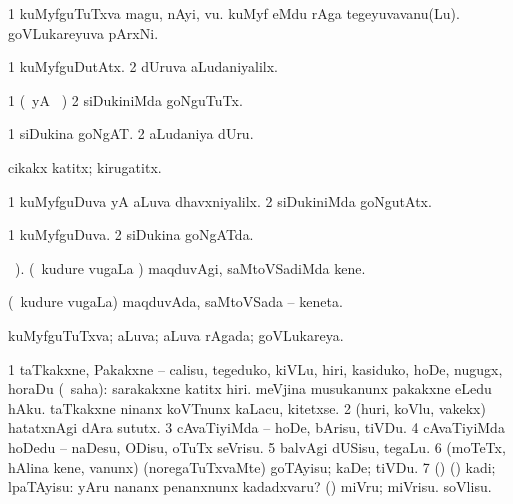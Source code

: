 {{{{{{\bentry
{} 
\gl{\nA}
\expl{}
\bmng
\bnum
\num{1} kuMyfguTuTxva magu, nAyi, \mo vu. 
\banum
{} kuMyf eMdu rAga tegeyuvavanu(Lu). 
 goVLukareyuva pArxNi. 
\eanum
\numie
\enum
\emng
\eentry

\bentry
{} 
\gl{\kirxvi}
\expl{}
\bmng
\bnum
\num{1} kuMyfguDutAtx. 
\num{2} dUruva aLudaniyalilx. 
\enum
\emng
\eentry

\bentry
{} 
\gl{\akirx}
\expl{}
\bmng
\bnum
\num{1} (\pArxM\ yA \AseTxrXV\ \parx)  
\num{2} siDukiniMda goNguTuTx. 
\enum
\emng
\eentry

\bentry
{} 
\gl{\nA}
\expl{}
\bmng
\bnum
\num{1} siDukina goNgAT. 
\num{2} aLudaniya dUru. 
\enum
\emng
\eentry

\bentry
{} 
\gl{\nA}
\expl{}
\bmng
cikakx katitx; kirugatitx. 
\emng
\eentry

\bentry
{} 
\gl{\kirxvi}
\expl{}
\bmng
\bnum
\num{1} kuMyfguDuva yA aLuva dhavxniyalilx. 
\num{2} siDukiniMda goNgutAtx. 
\enum
\emng
\eentry

\bentry
{} 
\gl{\gu}
\expl{}
\bmng
\bnum
\num{1} kuMyfguDuva. 
\num{2} siDukina goNgATda. 
\enum
\emng
\eentry

\bentry
{} 
\gl{\akirx}
 \BUkaq\ ). \bmng
(\sA\ kudure \mo vugaLa \vi) maqduvAgi, saMtoVSadiMda kene. 
\emng
\eentry

\bentry
{} 
\gl{\nA}
\bmng
(\sA\ kudure \mo vugaLa) maqduvAda, saMtoVSada -- keneta. 
\emng
\eentry

\bentry
{} 
\gl{\nA}
\expl{}
\bmng
{} 
\emng
\eentry

\bentry
{} 
\gl{\gu}
\bmng
kuMyfguTuTxva; aLuva; aLuva rAgada; goVLukareya. 
\emng
\eentry

\bentry
{} 
\gl{\sakirx}
\bmng
\bnum
\num{1} taTkakxne, Pakakxne -- calisu, tegeduko, kiVLu, hiri, kasiduko, hoDe, nugugx, horaDu (\akirx\ saha):  sarakakxne katitx hiri.  meVjina musukanunx pakakxne eLedu hAku.  taTkakxne ninanx koVTnunx kaLacu, kitetxse. 
\num{2} (huri, koVlu, \mo vakekx) hatatxnAgi dAra sututx. 
\num{3} cAvaTiyiMda -- hoDe, bArisu, tiVDu. 
\num{4} cAvaTiyiMda hoDedu -- naDesu, ODisu, oTuTx seVrisu. 
\num{5} balvAgi dUSisu, tegaLu. 
\num{6} (moTeTx, hAlina kene, \mo vanunx) (noregaTuTxvaMte) goTAyisu; kaDe; tiVDu. 
\num{7} (\birx) (\ashi) kadi; lpaTAyisu:  yAru nananx penanxnunx kadadxvaru? 
 (\ashi) 
\banum
{} miVru; miVrisu. 
 soVlisu. 
\eanum
\numie
\enum
\emng

}}}}}}
